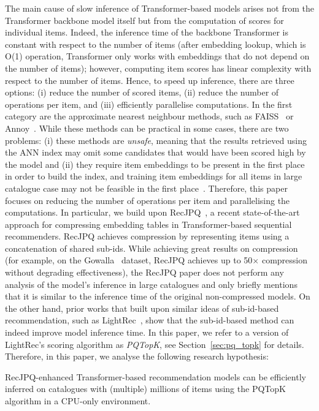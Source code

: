 \documentclass[sigconf,natbib=true, review=true]{acmart} %
\newcommand{\rsasha}[1]{\textcolor[HTML]{FF0000}{#1}}
\begin{document}
The main cause of slow inference of Transformer-based models arises not from the Transformer backbone model itself but from the computation of scores for individual items. Indeed, the inference time of the backbone Transformer is constant with respect to the number of items \rsasha{(after embedding lookup, which is O(1) operation, Transformer only works with embeddings that do not depend on the number of items)}; however, computing item scores has linear complexity with respect to the number of items. Hence, to speed up inference, there are three options: (i) reduce the number of scored items, (ii) reduce the number of operations per item, and (iii) efficiently parallelise computations. 
%
In the first category are the approximate nearest neighbour methods, such as FAISS~\cite{FAISS} or Annoy~\cite{SpotifyAnnoy2024}. While these methods can be practical in some cases, there are two problems: (i) these methods are \emph{unsafe}, meaning that the results retrieved using the ANN index may omit some candidates that would have been scored high by the model and (ii) they require item embeddings to be present in the first place in order to build the index, and training item embeddings for all items in large catalogue case may not be feasible in the first place~\cite{petrovRecJPQTrainingLargeCatalogue2024}.
%
Therefore, this paper focuses on reducing the number of operations per item and parallelising the computations. In particular, we build upon RecJPQ~\cite{petrovRecJPQTrainingLargeCatalogue2024}, a recent state-of-the-art approach for compressing embedding tables in Transformer-based sequential recommenders. RecJPQ achieves compression by representing items using a concatenation of shared sub-ids. While achieving great results on compression (for example, on the Gowalla~\cite{g} dataset, RecJPQ achieves up to 50$\times$ compression without degrading effectiveness), the RecJPQ paper does not perform any analysis of the model's inference in large catalogues and only briefly mentions that it is similar to the inference time of the original non-compressed models. On the other hand, prior works that built upon similar ideas of sub-id-based recommendation, such as LightRec~\cite{lianLightRecMemorySearchEfficient2020}, show that the sub-id-based method can indeed improve model inference time. \rsasha{In this paper, we refer to a version of LightRec's scoring algorithm as \textit{PQTopK}, see Section~\ref{sec:pq_topk} for details.} Therefore, in this paper, we analyse the following research hypothesis:
\begin{tcolorbox}[enhanced, drop shadow, title={Hypothesis H1}]

\label{hyp:h0}
    RecJPQ-enhanced Transformer-based recommendation models can be efficiently inferred on catalogues with (multiple) millions of items using the PQTopK algorithm in a CPU-only environment. 
\end{tcolorbox}
\end{document}
